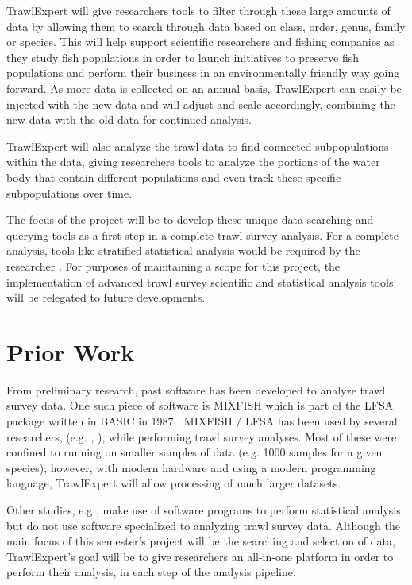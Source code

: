 \documentclass{article}
\begin{document}
TrawlExpert will give researchers tools to filter through these large amounts of data by allowing them to search through data based on class, order, genus, family or species. This will help support scientific researchers and fishing companies as they study fish populations in order to launch initiatives to preserve fish populations and perform their business in an environmentally friendly way going forward. As more data is collected on an annual basis, TrawlExpert can easily be injected with the new data and will adjust and scale accordingly, combining the new data with the old data for continued analysis.

TrawlExpert will also analyze the trawl data to find connected subpopulations within the data, giving researchers  tools to analyze the portions of the water body that contain different populations and even track these specific subpopulations over time.

The focus of the project will be to develop these unique data searching and querying tools as a first step in a complete trawl survey analysis. For a complete analysis, tools like stratified statistical analysis would be required by the researcher \citep{walsh1997efficiency}. For purposes of maintaining a scope for this project, the implementation of advanced trawl survey scientific and statistical analysis tools will be relegated to future developments. 

\section{Prior Work}
From preliminary research, past software has been developed to analyze trawl survey data. One such piece of software is MIXFISH which is part of the LFSA package written in BASIC in 1987 \citep{sparre1987computer}. MIXFISH / LFSA has been used by several researchers, (e.g. \cite{levi1993analysis}, \cite{chakraborty1996stock}), while performing trawl survey analyses. Most of these were confined to running on smaller samples of data (e.g. 1000 samples for a given species); however, with modern hardware and using a modern programming language, TrawlExpert will allow processing of much larger datasets.

Other studies, e.g \cite{swartzman1992spatial}, make use of software programs to perform statistical analysis but do not use software specialized to analyzing trawl survey data. Although the main focus of this semester's project will be the searching and selection of data, TrawlExpert's goal will be to give researchers an all-in-one platform in order to perform their analysis, in each step of the analysis pipeline.
\end{document}
